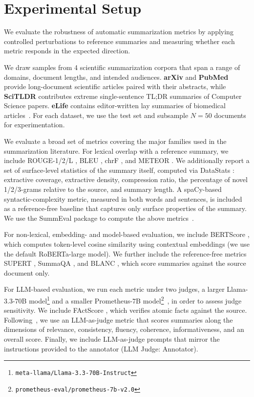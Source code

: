 \section[Experimental Setup]{Experimental Setup \hyperref[chsevenrq1]{\chsevenrqone}}\label{sec:ch-7-experimental-setup}

We evaluate the robustness of automatic summarization metrics by
applying controlled perturbations to reference summaries and measuring
whether each metric responds in the expected direction. 

We draw samples from 4 scientific summarization corpora that span
a range of domains, document lengths, and intended audiences.
\textbf{arXiv} and \textbf{PubMed} \cite{cohan2018discourse} provide
long-document scientific articles paired with their abstracts, while
\textbf{SciTLDR} \cite{cachola2020tldr} contributes extreme
single-sentence TL;DR summaries of Computer Science papers. \textbf{eLife} contains editor-written lay summaries of biomedical articles~\cite{goldsack2022making}.
For each dataset, we use the test set and subsample $N{=}50$ documents for experimentation.

We evaluate a broad set of metrics covering the major families used in
the summarization literature. For lexical overlap with a reference
summary, we include ROUGE-1/2/L \cite{lin2004rouge},
BLEU \cite{papineni2002bleu}, chrF \cite{popovic2017chrf}, and
METEOR \cite{banerjee2005meteor}. We additionally report a set of
surface-level statistics of the summary itself, computed via
DataStats \cite{grusky2018newsroom}: extractive coverage, extractive
density, compression ratio, the percentage of novel 1/2/3-grams
relative to the source, and summary length. A spaCy-based
\cite{honnibal2020spacy} syntactic-complexity metric, measured in
both words and sentences, is included as a reference-free baseline
that captures only surface properties of the summary. We use the
SummEval package to compute the above metrics~\cite{fabbri2021summeval}.
 
For non-lexical, embedding- and model-based evaluation, we include
BERTScore \cite{zhang2020bertscore}, which computes token-level
cosine similarity using contextual embeddings (we use the default
RoBERTa-large model). We further include the reference-free metrics
SUPERT \cite{gao2020supert}, SummaQA \cite{scialom2019summa}, and
BLANC \cite{vasilyev2020blanc}, which score summaries against the
source document only.
 
For LLM-based evaluation, we run each metric under two judges, a
larger Llama-3.3-70B model\footnote{\texttt{meta-llama/Llama-3.3-70B-Instruct}} and a smaller Prometheus-7B
model\footnote{\texttt{prometheus-eval/prometheus-7b-v2.0}}~\cite{kim2023prometheus, grattafiori2024llama3}, in order to assess judge sensitivity.
We include FActScore \cite{min2023factscore}, which verifies atomic
facts against the source. Following~\textcite{liu2023geval}, we use an
LLM-as-judge metric \cite{zheng2023judging} that scores summaries
along the dimensions of relevance, consistency, fluency, coherence,
informativeness, and an overall score. Finally, we include
LLM-as-judge prompts that mirror the instructions provided to the
annotator (LLM Judge: Annotator). 

